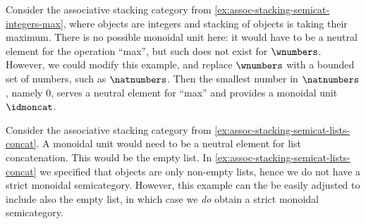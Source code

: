 

\begin{example}
    Consider the associative stacking category from \cref{ex:assoc-stacking-semicat-integers-max}, where objects are integers and stacking of objects is taking their maximum.
    There is no possible monoidal unit here: it would have to be a neutral element for the operation ``max'', but such does not exist for $\wnumbers$.
    However, we could modify this example, and replace $\wnumbers$ with a bounded set of numbers, such as $\natnumbers$.
    Then the smallest number in $\natnumbers$, namely $0$, serves a neutral element for ``max'' and provides a monoidal unit $\idmoncat$.
\end{example}

\begin{example}
    Consider the associative stacking category from \cref{ex:assoc-stacking-semicat-lists-concat}.
    A monoidal unit would need to be a neutral element for list concatenation.
    This would be the empty list.
    In \cref{ex:assoc-stacking-semicat-lists-concat} we specified that objects are only non-empty lists, hence we do not have a strict monoidal semicategory.
    However, this example can the be easily adjusted to include also the empty list, in which case we \emph{do} obtain a strict monoidal semicategory.
\end{example}

